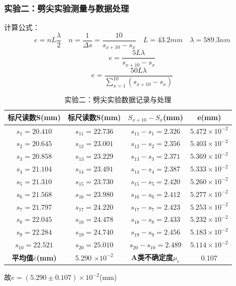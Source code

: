 \documentclass[]{../../templates/Report}%
\begin{document}
\begin{fullreportonly}
\subsubsection{实验二：劈尖实验测量与数据处理}
计算公式：
\[
e = nL\frac{\lambda}{2} \quad n = \frac{1}{\Delta s} = \frac{10}{s_{x+10}-s_x} \quad L = 43.2mm \quad \lambda = 589.3nm
\]
\[
e = \frac{5L \lambda}{s_{x+10}-s_x}
\]
\[
e = \frac{50L \lambda}{\sum_{x=1}^{10}(s_{x+10}-s_x)}
\]
\begin{table}[H]
    \centering
    \caption{实验二：劈尖实验数据记录与处理}
    \begin{tabular}{|c|c|c|c|}
        \hline
        \textbf{标尺读数S(mm)} & \textbf{标尺读数S(mm)} & \textbf{$S_{x+10}-S_x$(mm)} & \textbf{e(mm)}  \\
        \hline
        $s_1 = 20.410$ & $s_{11} = 22.736$ & $s_{11}-s_1 = 2.326$ & $5.472 \times 10^{-2}$  \\
        \hline
        $s_2 = 20.645$ & $s_{12} = 23.001$ & $s_{12}-s_2 = 2.356$ & $5.403 \times 10^{-2}$  \\
        \hline
        $s_3 = 20.858$ & $s_{13} = 23.229$ & $s_{13}-s_3 = 2.371$ & $5.369 \times 10^{-2}$ \\
        \hline
        $s_4 = 21.104$ & $s_{14} = 23.491$ & $s_{14}-s_4 = 2.387$ & $5.333 \times 10^{-2}$  \\
        \hline
        $s_5 = 21.310$ & $s_{15} = 23.730$ & $s_{15}-s_5 = 2.420$ & $5.260 \times 10^{-2}$  \\
        \hline
        $s_6 = 21.568$ & $s_{16} = 23.980$ & $s_{16}-s_6 = 2.412$ & $5.277 \times 10^{-2}$  \\
        \hline
        $s_7 = 21.797$ & $s_{17} = 24.220$ & $s_{17}-s_7 = 2.423$ & $5.253 \times 10^{-2}$  \\
        \hline
        $s_8 = 22.045$ & $s_{18} = 24.478$ & $s_{18}-s_8 = 2.433$ & $5.232 \times 10^{-2}$  \\
        \hline
        $s_9 = 22.284$ & $s_{19} = 24.740$ & $s_{19}-s_9 = 2.456$ & $5.183 \times 10^{-2}$  \\
        \hline
        $s_{10} = 22.521$ & $s_{20} = 25.010$ & $s_{20}-s_{10} = 2.489$ & $5.114 \times 10^{-2}$  \\
        \hline
        \textbf{平均值$\bar{e}$(mm)} & 5.290 $\times 10^{-2}$ & \textbf{A类不确定度$\mu_e$} & 0.107 \\
        \hline
    \end{tabular}
\end{table}
故$e = (5.290 \pm 0.107) \times 10^{-2}$(mm)


\end{fullreportonly}
\end{document}
